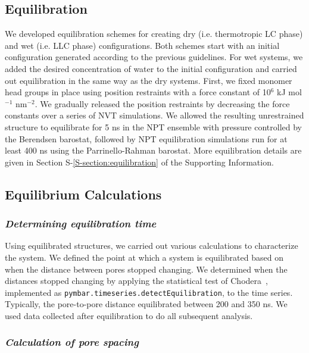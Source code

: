 \documentclass[journal=jpcbfk,manuscript=article]{achemso}
\begin{document}
  \subsection{Equilibration}\label{section:equilibration}
  
  We developed equilibration schemes for creating dry (i.e. thermotropic LC phase)
  and wet (i.e. LLC phase) configurations.
  Both schemes start with an initial configuration generated according to the
  previous guidelines. For wet systems, we added the desired concentration of
  water to the initial configuration and carried out equilibration in the same
  way as the dry systems. First, we fixed monomer head groups in place using
  position restraints with a force constant of 10$^6$ kJ mol$^{-1}$ nm$^{-2}$. We
  gradually released the position restraints by decreasing the force constants
  over a series of NVT simulations. We allowed the resulting unrestrained
  structure to equilibrate for 5 ns in the NPT ensemble with pressure controlled
  by the Berendsen barostat, followed by NPT equilibration simulations run for at
  least 400 ns using the Parrinello-Rahman barostat. More equilibration details
  are given in Section S-\ref{S-section:equilibration} of the Supporting Information.

  \subsection{Equilibrium Calculations}

  \subsubsection{\textit{Determining equilibration time}}\label{method:equil_time}

  Using equilibrated structures, we carried out various calculations to
  characterize the system. We defined the point at which a system is equilibrated
  based on when the distance between pores stopped changing.  We determined when
  the distances stopped changing by applying the statistical test of Chodera~\cite{chodera_simple_2016},
  implemented as \texttt{pymbar.timeseries.detectEquilibration}, to the time series. Typically, the pore-to-pore
  distance equilibrated between 200 and 350 ns. We used data collected after 
  equilibration to do all subsequent analysis.

  \subsubsection{\textit{Calculation of pore spacing}}\label{method:pore_spacing}
\end{document}
